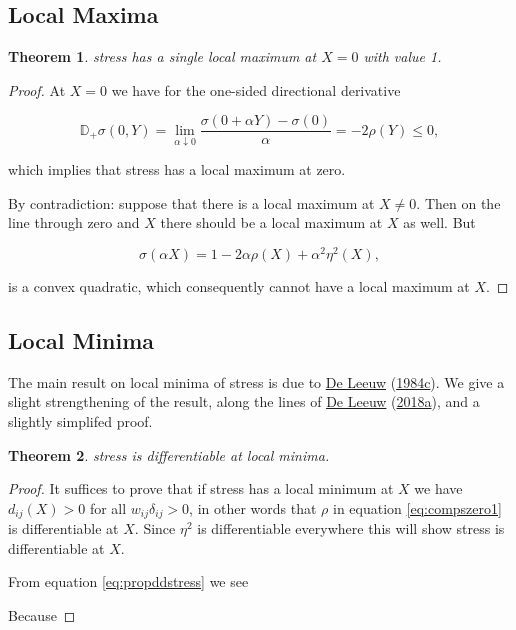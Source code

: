 \documentclass[
  12pt,
]{book}
\newtheorem{theorem}{Theorem}[chapter]
\theoremstyle{definition}
\theoremstyle{definition}
\theoremstyle{definition}
\theoremstyle{definition}
\theoremstyle{remark}
\begin{document}
\hypertarget{local-maxima}{%
\subsection{Local Maxima}\label{local-maxima}}

\begin{theorem}
\protect\hypertarget{thm:locmax}{}{\label{thm:locmax} }stress has a single local maximum at \(X=0\) with value 1.
\end{theorem}

\begin{proof}
At \(X=0\) we have for the one-sided directional derivative

\begin{equation}
\mathbb{D}_+\sigma(0,Y)=\lim_{\alpha\downarrow 0}\frac{\sigma(0+\alpha Y)-\sigma(0)}{\alpha}=-2\rho(Y)\leq 0,
\label{eq:datzero}
\end{equation}

which implies that stress has a local maximum at zero.

By contradiction: suppose that there is a local maximum at \(X\not= 0\). Then on the line through zero and \(X\) there should be a local maximum at \(X\) as well. But

\begin{equation}
\sigma(\alpha X)=1-2\alpha\rho(X)+\alpha^2\eta^2(X),
\label{eq:propnomax}
\end{equation}

is a convex quadratic, which consequently cannot have a local maximum at \(X\).
\end{proof}

\hypertarget{proplocmin}{%
\subsection{Local Minima}\label{proplocmin}}

The main result on local minima of stress is due to \protect\hyperlink{ref-deleeuw_A_84f}{De Leeuw} (\protect\hyperlink{ref-deleeuw_A_84f}{1984c}). We
give a slight strengthening of the result, along the lines of
\protect\hyperlink{ref-deleeuw_E_18c}{De Leeuw} (\protect\hyperlink{ref-deleeuw_E_18c}{2018a}), and a slightly simplifed proof.

\begin{theorem}
\protect\hypertarget{thm:locmin}{}{\label{thm:locmin} }stress is differentiable at local minima.
\end{theorem}

\begin{proof}
It suffices to prove that if stress has a local minimum at \(X\) we have \(d_{ij}(X)>0\) for all \(w_{ij}\delta_{ij}>0\), in other words that \(\rho\) in equation \eqref{eq:compszero1} is differentiable at \(X\). Since \(\eta^2\) is
differentiable everywhere this will show stress is differentiable at
\(X\).

From equation \eqref{eq:propddstress} we see

Because
\end{proof}
\end{document}
